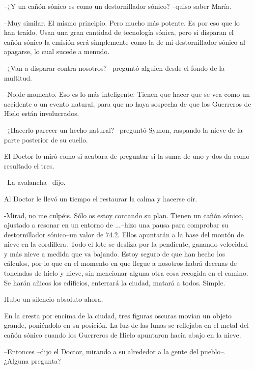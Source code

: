 --¿Y un cañón sónico es como un destornillador sónico? --quiso saber María.



--Muy similar. El mismo principio. Pero mucho más potente. Es por eso que lo han traído. Usan una gran cantidad de tecnología sónica, pero si disparan el cañón sónico la emisión será simplemente como la de mi destornillador sónico al apagarse, lo cual sucede a menudo.



--¿Van a disparar contra nosotros? --preguntó alguien desde el fondo de la multitud.



--No,de momento. Eso es lo más inteligente. Tienen que hacer que se vea como un accidente o un evento natural, para que no haya sospecha de que los Guerreros de Hielo están involucrados.



--¿Hacerlo parecer un hecho natural? --preguntó Symon, raspando la nieve de la parte posterior de su cuello.



El Doctor lo miró como si acabara de preguntar si la suma de uno y dos da como resultado el tres. 

--La avalancha --dijo.



Al Doctor le llevó un tiempo el restaurar la calma y hacerse oír. 


-Mirad, no me culpéis. Sólo os estoy contando su plan. Tienen un cañón sónico, ajustado a resonar en un entorno de ...--hizo una pausa para comprobar su destornillador sónico--un valor de 74.2. Ellos apuntarán a la base del montón de nieve en la cordillera. Todo el lote se desliza por la pendiente, ganando velocidad y más nieve a medida que va bajando. Estoy seguro de que han hecho los cálculos, por lo que en el momento en que llegue a nosotros habrá decenas de toneladas de hielo y nieve, sin mencionar alguna otra cosa recogida en el camino. Se harán añicos los edificios, enterrará la ciudad, matará a todos. Simple.



Hubo un silencio absoluto ahora.



En la cresta por encima de la ciudad, tres figuras oscuras movían un objeto grande, poniéndolo en su posición. La luz de las lunas se reflejaba en el metal del cañón sónico cuando los Guerreros de Hielo apuntaron hacia abajo en la nieve.



--Entonces --dijo el Doctor, mirando a su alrededor a la gente del pueblo--. ¿Alguna pregunta? 
